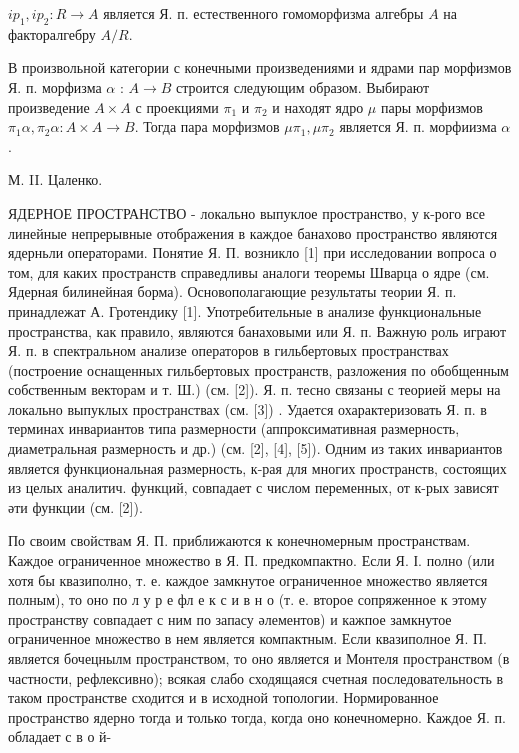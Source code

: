 \documentclass[10pt]{article}
\begin{document}
$i p_{1}, i p_{2}: R \rightarrow A$ является Я. п. естественного гомоморфизма алгебры $A$ на факторалгебру $A / R$.



В произвольной категории с конечными произведениями и ядрами пар морфизмов Я. п. морфизма $\alpha$ : $A \rightarrow B$ строится следующим образом. Выбирают произведение $A \times A$ с проекциями $\pi_{1}$ и $\pi_{2}$ и находят ядро $\mu$ пары морфизмов $\pi_{1} \alpha, \pi_{2} \alpha: A \times A \rightarrow B$. Тогда пара морфизмов $\mu \pi_{1}, \mu \pi_{2}$ является Я. п. морфиизма $\alpha$.



М. II. Цаленко.



ЯДЕРНОЕ ПРОСТРАНСТВО - локально выпуклое пространство, у к-рого все линейные непрерывные отображения в каждое банахово пространство являются ядерньли операторами. Понятие Я. П. возникло [1] при исследовании вопроса о том, для каких пространств справедливы аналоги теоремы Шварца о ядре (см. Ядерная билинейная борма). Основополагающие результаты теории Я. п. принадлежат А. Гротендику [1]. Употребительные в анализе функциональные пространства, как правило, являются банаховыми или Я. п. Важную роль играют Я. п. в спектральном анализе операторов в гильбертовых пространствах (построение оснащенных гильбертовых пространств, разложения по обобщенным собственным векторам и т. Ш.) (см. [2]). Я. п. тесно связаны с теорией меры на локально выпуклых пространствах (см. [3]) . Удается охарактеризовать Я. п. в терминах инвариантов типа размерности (аппроксимативная размерность, диаметральная размерность и др.) (см. [2], [4], [5]). Одним из таких инвариантов является функциональная размерность, к-рая для многих пространств, состоящих из целых аналитич. функций, совпадает с числом переменных, от к-рых зависят әти функции (см. [2]).



По своим свойствам Я. П. приближаются к конечномерным пространствам. Каждое ограниченное множество в Я. П. предкомпактно. Если Я. І. полно (или хотя бы квазиполно, т. е. каждое замкнутое ограниченное множество является полным), то оно по л у р е фл е к с и в н о (т. е. второе сопряженное к этому пространству совпадает с ним по запасу әлементов) и кажпое замкнутое ограниченное множество в нем является компактным. Если квазиполное Я. П. является бочецнылм пространством, то оно является и Монтеля пространством (в частности, рефлексивно); всякая слабо сходящаяся счетная последовательность в таком пространстве сходится и в исходной топологии. Нормированное пространство ядерно тогда и только тогда, когда оно конечномерно. Каждое Я. п. обладает с в о й-
\end{document}
